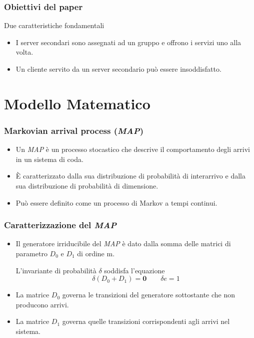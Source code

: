 \documentclass{beamer}
\begin{document}
\begin{frame}
    \frametitle{Obiettivi del paper}
    \begin{block}{Due caratteristiche fondamentali}
    \begin{itemize}
        \item I server secondari sono assegnati ad un gruppo e offrono i servizi uno alla volta.
        \item Un cliente servito da un server secondario può essere insoddisfatto.
    \end{itemize}
    \end{block}
\end{frame}


\section{Modello Matematico}


\begin{frame}
    \frametitle{Markovian arrival process (\emph{MAP})}
    \begin{itemize}
        \item Un \emph{MAP} è un processo stocastico che descrive il comportamento degli arrivi in un sistema di coda.
        \item È caratterizzato dalla sua distribuzione di probabilità di interarrivo e dalla sua distribuzione di probabilità di dimensione.
        \item Può essere definito come un processo di Markov a tempi continui.
    \end{itemize}
\end{frame}



\begin{frame}
    \frametitle{Caratterizzazione del \emph{MAP}}
    \begin{itemize}
        \item Il generatore irriducibile del \emph{MAP} è dato dalla somma delle matrici di parametro $D_0$ e $D_1$ di ordine m.
            \begin{block}{}
                L'invariante di probabilità $\delta$ soddisfa l'equazione
                $$\delta (D_0 + D_1) = \textbf{0} \qquad \delta e = 1$$
            \end{block}
        \item La matrice $D_0$ governa le transizioni del generatore sottostante che non producono arrivi.
        \item La matrice $D_1$ governa quelle transizioni corrispondenti agli arrivi nel sistema.
    \end{itemize}
\end{frame}
\end{document}
